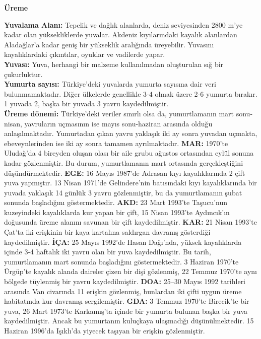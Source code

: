 \documentclass[
  10.5pt,
  a4paper,
  DIV=11,
  numbers=noendperiod,
  twocolumn]{scrreprt}
\begin{document}
\textbf{Üreme}

\textbf{Yuvalama Alanı:} Tepelik ve dağlık alanlarda, deniz seviyesinden
2800 m'ye kadar olan yüksekliklerde yuvalar. Akdeniz kıyılarındaki
kayalık alanlardan Aladağlar'a kadar geniş bir yükseklik aralığında
üreyebilir. Yuvasını kayalıklardaki çıkıntılar, oyuklar ve vadilerde
yapar.\\
\textbf{Yuvası:} Yuva, herhangi bir malzeme kullanılmadan oluşturulan
sığ bir çukurluktur.\\
\textbf{Yumurta sayısı:} Türkiye'deki yuvalarda yumurta sayısına dair
veri bulunmamaktadır. Diğer ülkelerde genellikle 3-4 olmak üzere 2-6
yumurta bırakır. 1 yuvada 2, başka bir yuvada 3 yavru kaydedilmiştir.\\
\textbf{Üreme dönemi:} Türkiye'deki veriler sınırlı olsa da,
yumurtlamanın mart sonu-nisan, yavruların uçmasının ise mayıs
sonu-haziran arasında olduğu anlaşılmaktadır. Yumurtadan çıkan yavru
yaklaşık iki ay sonra yuvadan uçmakta, ebeveynlerinden ise iki ay sonra
tamamen ayrılmaktadır. \textbf{MAR:} 1970'te Uludağ'da 4 bireyden oluşan
olası bir aile grubu ağustos ortasından eylül sonuna kadar gözlenmiştir.
Bu durum, yumurtlamanın mart ortasında gerçekleştiğini düşündürmektedir.
\textbf{EGE:} 16 Mayıs 1987'de Adrasan kıyı kayalıklarında 2 çift yuva
yapmıştır. 13 Nisan 1971'de Gelindere'nin batısındaki kıyı
kayalıklarında bir yuvada yaklaşık 14 günlük 3 yavru gözlenmiştir, bu da
yumurtlamanın şubat sonunda başladığını göstermektedir. \textbf{AKD:} 23
Mart 1993'te Taşucu'nun kuzeyindeki kayalıklarda kur yapan bir çift, 15
Nisan 1993'te Aydıncık'ın doğusunda üreme alanını savunan bir çift
kaydedilmiştir. \textbf{KAR:} 21 Nisan 1993'te Çat'ta iki erişkinin bir
kaya kartalına saldırgan davranış gösterdiği kaydedilmiştir.
\textbf{İÇA:} 25 Mayıs 1992'de Hasan Dağı'nda, yüksek kayalıklarda
içinde 3-4 haftalık iki yavru olan bir yuva kaydedilmiştir. Bu tarih,
yumurtlamanın mart sonunda başladığını göstermektedir. 3 Haziran 1970'te
Ürgüp'te kayalık alanda daireler çizen bir dişi gözlenmiş, 22 Temmuz
1970'te aynı bölgede tüylenmiş bir yavru kaydedilmiştir. \textbf{DOA:}
25--30 Mayıs 1992 tarihleri arasında Van civarında 11 erişkin gözlenmiş,
bunlardan iki çifti uygun üreme habitatında kur davranışı sergilemiştir.
\textbf{GDA:} 3 Temmuz 1970'te Birecik'te bir yuva, 26 Mart 1973'te
Karkamış'ta içinde bir yumurta bulunan başka bir yuva kaydedilmiştir.
Ancak bu yumurtanın kuluçkaya ulaşmadığı düşünülmektedir. 15 Haziran
1996'da Işıklı'da yiyecek taşıyan bir erişkin gözlenmiştir.
\end{document}
